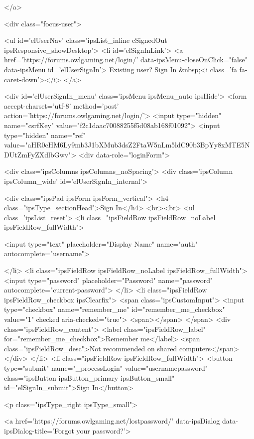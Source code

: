 	
</a>
									
										<div class="focus-user">

	<ul id='elUserNav' class='ipsList_inline cSignedOut ipsResponsive_showDesktop'>
		<li id='elSignInLink'>
			<a href='https://forums.owlgaming.net/login/' data-ipsMenu-closeOnClick="false" data-ipsMenu id='elUserSignIn'>
				Existing user? Sign In &nbsp;<i class='fa fa-caret-down'></i>
			</a>
			
<div id='elUserSignIn_menu' class='ipsMenu ipsMenu_auto ipsHide'>
	<form accept-charset='utf-8' method='post' action='https://forums.owlgaming.net/login/'>
		<input type="hidden" name="csrfKey" value="f2c1daac70088255f5d08ab168f01092">
		<input type="hidden" name="ref" value="aHR0cHM6Ly9mb3J1bXMub3dsZ2FtaW5nLm5ldC90b3BpYy8xMTE5NDUtZmFyZXdlbGwv">
		<div data-role="loginForm">
			
			
			
				<div class='ipsColumns ipsColumns_noSpacing'>
					<div class='ipsColumn ipsColumn_wide' id='elUserSignIn_internal'>
						
<div class="ipsPad ipsForm ipsForm_vertical">
	<h4 class="ipsType_sectionHead">Sign In</h4>
	<br><br>
	<ul class='ipsList_reset'>
		<li class="ipsFieldRow ipsFieldRow_noLabel ipsFieldRow_fullWidth">
			
			
				<input type="text" placeholder="Display Name" name="auth" autocomplete="username">
			
		</li>
		<li class="ipsFieldRow ipsFieldRow_noLabel ipsFieldRow_fullWidth">
			<input type="password" placeholder="Password" name="password" autocomplete="current-password">
		</li>
		<li class="ipsFieldRow ipsFieldRow_checkbox ipsClearfix">
			<span class="ipsCustomInput">
				<input type="checkbox" name="remember_me" id="remember_me_checkbox" value="1" checked aria-checked="true">
				<span></span>
			</span>
			<div class="ipsFieldRow_content">
				<label class="ipsFieldRow_label" for="remember_me_checkbox">Remember me</label>
				<span class="ipsFieldRow_desc">Not recommended on shared computers</span>
			</div>
		</li>
		<li class="ipsFieldRow ipsFieldRow_fullWidth">
			<button type="submit" name="_processLogin" value="usernamepassword" class="ipsButton ipsButton_primary ipsButton_small" id="elSignIn_submit">Sign In</button>
			
				<p class="ipsType_right ipsType_small">
					
						<a href='https://forums.owlgaming.net/lostpassword/' data-ipsDialog data-ipsDialog-title='Forgot your password?'>
					
